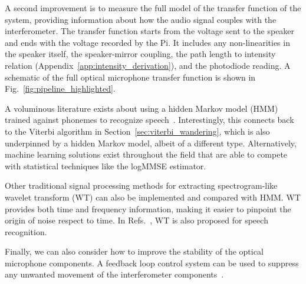 \documentclass[paper-main.tex]{subfiles}
\begin{document}
A second improvement is to measure the full model of the transfer function of the system, providing information about how the audio signal couples with the interferometer.
The transfer function starts from the voltage sent to the speaker and ends with the voltage recorded by the Pi. 
It includes any non-linearities in the speaker itself, the speaker-mirror coupling, the path length to intensity relation (Appendix~\ref{app:intensity_derivation}), and the photodiode reading. 
A schematic of the full optical microphone transfer function is shown in Fig.~\ref{fig:pipeline_highlighted}.

A voluminous literature exists about using a hidden Markov model (HMM) trained against phonemes to recognize speech~\cite{HMM_english}. 
Interestingly, this connects back to the Viterbi algorithm in Section~\ref{sec:viterbi_wandering}, which is also underpinned by a hidden Markov model, albeit of a different type. 
Alternatively, machine learning solutions exist throughout the field that are able to compete~\cite{SEGAN} with statistical techniques like the logMMSE estimator.

Other traditional signal processing methods for extracting spectrogram-like wavelet transform (WT) \citep{nason1995stationary} can also be implemented and compared with HMM. 
WT provides both time and frequency information, making it easier to pinpoint the origin of noise respect to time. 
In Refs.~\cite{tufekci2000feature,agbinya1996discrete}, WT is also proposed for speech recognition. 

Finally, we can also consider how to improve the stability of the optical microphone components.
A feedback loop control system can be used to suppress any unwanted movement of the interferometer components~\citep{abbott2017exploring, Sekiguchi:2016bmv, verhoeven2009robust}. 

\end{document}
